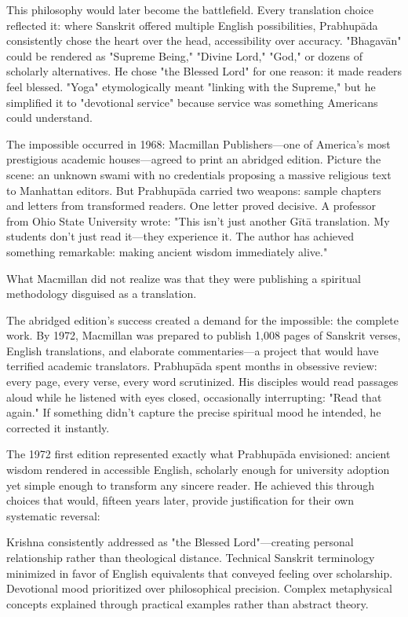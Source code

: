 \documentclass[11pt,twoside]{book}
\begin{document}
This philosophy would later become the battlefield. Every translation choice reflected it: where Sanskrit offered multiple English possibilities, Prabhupāda consistently chose the heart over the head, accessibility over accuracy. "Bhagavān" could be rendered as "Supreme Being," "Divine Lord," "God," or dozens of scholarly alternatives. He chose "the Blessed Lord" for one reason: it made readers feel blessed. "Yoga" etymologically meant "linking with the Supreme," but he simplified it to "devotional service" because service was something Americans could understand.

The impossible occurred in 1968: Macmillan Publishers—one of America's most prestigious academic houses—agreed to print an abridged edition. Picture the scene: an unknown swami with no credentials proposing a massive religious text to Manhattan editors. But Prabhupāda carried two weapons: sample chapters and letters from transformed readers. One letter proved decisive. A professor from Ohio State University wrote: "This isn't just another Gītā translation. My students don't just read it—they experience it. The author has achieved something remarkable: making ancient wisdom immediately alive."

What Macmillan did not realize was that they were publishing a spiritual methodology disguised as a translation.

The abridged edition's success created a demand for the impossible: the complete work. By 1972, Macmillan was prepared to publish 1,008 pages of Sanskrit verses, English translations, and elaborate commentaries—a project that would have terrified academic translators. Prabhupāda spent months in obsessive review: every page, every verse, every word scrutinized. His disciples would read passages aloud while he listened with eyes closed, occasionally interrupting: "Read that again." If something didn't capture the precise spiritual mood he intended, he corrected it instantly.

The 1972 first edition represented exactly what Prabhupāda envisioned: ancient wisdom rendered in accessible English, scholarly enough for university adoption yet simple enough to transform any sincere reader. He achieved this through choices that would, fifteen years later, provide justification for their own systematic reversal:

Krishna consistently addressed as "the Blessed Lord"—creating personal relationship rather than theological distance. Technical Sanskrit terminology minimized in favor of English equivalents that conveyed feeling over scholarship. Devotional mood prioritized over philosophical precision. Complex metaphysical concepts explained through practical examples rather than abstract theory.
\end{document}
